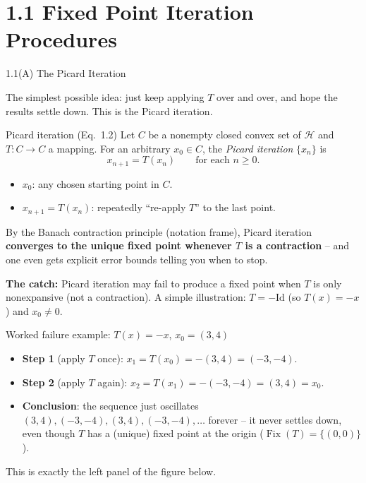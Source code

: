 \documentclass[aspectratio=169,10pt]{beamer}
\newcommand{\Hil}{\mathcal{H}}
\newcommand{\Fix}{\operatorname{Fix}}
\newcommand{\Id}{\mathrm{Id}}
\begin{document}
\section{1.1 Fixed Point Iteration Procedures}

\begin{frame}[allowframebreaks]{1.1(A) The Picard Iteration}

The simplest possible idea: just keep applying $T$ over and over, and hope
the results settle down. This is the Picard iteration.

\begin{block}{Picard iteration (Eq.\ 1.2)}
Let $C$ be a nonempty closed convex set of $\Hil$ and $T:C\to C$ a mapping.
For an arbitrary $x_0\in C$, the \emph{Picard iteration} $\{x_n\}$ is
\[
  x_{n+1} = T(x_n) \qquad \text{for each } n\ge 0.
\]
\begin{itemize}
  \item $x_0$: any chosen starting point in $C$.
  \item $x_{n+1}=T(x_n)$: repeatedly ``re-apply $T$'' to the last point.
\end{itemize}
\end{block}

By the Banach contraction principle (notation frame), Picard iteration
\textbf{converges to the unique fixed point whenever $T$ is a contraction}
-- and one even gets explicit error bounds telling you when to stop.

\framebreak

\textbf{The catch:} Picard iteration may fail to produce a fixed point
when $T$ is only nonexpansive (not a contraction). A simple illustration:
$T=-\Id$ (so $T(x)=-x$) and $x_0\ne 0$.

\begin{block}{Worked failure example: $T(x)=-x$, $x_0=(3,4)$}
\begin{itemize}
  \item \textbf{Step 1} (apply $T$ once): $x_1 = T(x_0) = -(3,4) = (-3,-4)$.
  \item \textbf{Step 2} (apply $T$ again): $x_2 = T(x_1) = -(-3,-4) = (3,4) = x_0$.
  \item \textbf{Conclusion}: the sequence just oscillates
    $(3,4),(-3,-4),(3,4),(-3,-4),\dots$ forever -- it never settles down,
    even though $T$ has a (unique) fixed point at the origin
    ($\Fix(T)=\{(0,0)\}$).
\end{itemize}
This is exactly the left panel of the figure below.
\end{block}


\end{frame}
\end{document}
